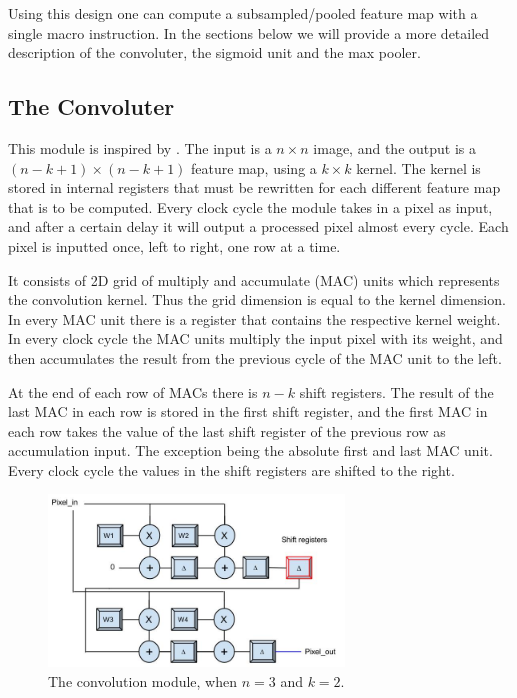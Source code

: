 Using this design one can compute a subsampled/pooled feature map with a single macro instruction. In the sections below we will provide a more detailed description of the convoluter, the sigmoid unit and the max pooler. 


\subsection{The Convoluter} \label{sec_convoluter}

This module is inspired by \cite{Farabet2009}. The input is a $ n \times n $ image, and the output is a $ (n-k+1) \times (n-k+1) $ feature map, using a $ k \times k $ kernel. The kernel is stored in internal registers that must be rewritten for each different feature map that is to be computed. Every clock cycle the module takes in a pixel as input, and after a certain delay it will output a processed pixel almost every cycle. Each pixel is inputted once, left to right, one row at a time. 

It consists of 2D grid of multiply and accumulate (MAC) units which represents the convolution kernel. Thus the grid dimension is equal to the kernel dimension. In every MAC unit there is a register that contains the respective kernel weight. In every clock cycle the MAC units multiply the input pixel with its weight, and then accumulates the result from the previous cycle of the MAC unit to the left. 

At the end of each row of MACs there is $ n - k $ shift registers. The result of the last MAC in each row is stored in the first shift register, and the first MAC in each row takes the value of the last shift register of the previous row as accumulation input. The exception being the absolute first and last MAC unit. Every clock cycle the values in the shift registers are shifted to the right. 

\begin{figure}[h!]
  \centering
      \includegraphics[width=0.7\textwidth]{Figures/Method/Convolver}
  \caption{The convolution module, when $ n = 3 $ and $ k = 2 $.}
\end{figure}
	
